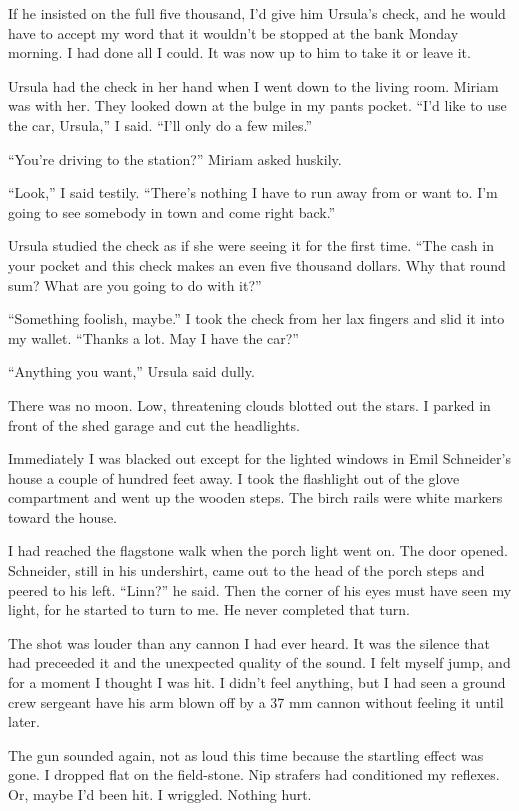 \documentclass{novel}
\begin{document}
If he insisted on the full five thousand, I’d give him Ursula’s check, and he would have to accept my word that it wouldn’t be stopped at the bank Monday morning. I had done all I could. It was now up to him to take it or leave it.

Ursula had the check in her hand when I went down to the living room. Miriam was with her. They looked down at the bulge in my pants pocket. “I’d like to use the car, Ursula,” I said. “I’ll only do a few miles.”

“You’re driving to the station?” Miriam asked huskily.

“Look,” I said testily. “There’s nothing I have to run away from or want to. I’m going to see somebody in town and come right back.”

Ursula studied the check as if she were seeing it for the first time. “The cash in your pocket and this check makes an even five thousand dollars. Why that round sum? What are you going to do with it?”

“Something foolish, maybe.” I took the check from her lax fingers and slid it into my wallet. “Thanks a lot. May I have the car?”

“Anything you want,” Ursula said dully.

\scenestars

There was no moon. Low, threatening clouds blotted out the stars. I parked in front of the shed garage and cut the headlights. 

Immediately I was blacked out except for the lighted windows in Emil Schneider’s house a couple of hundred feet away. I took the flashlight out of the glove compartment and went up the wooden steps. The birch rails were white markers toward the house.

I had reached the flagstone walk when the porch light went on. The door opened. Schneider, still in his undershirt, came out to the head of the porch steps and peered to his left. “Linn?” he said. Then the corner of his eyes must have seen my light, for he started to turn to me. He never completed that turn.

The shot was louder than any cannon I had ever heard. It was the silence that had preceeded it and the unexpected quality of the sound. I felt myself jump, and for a moment I thought I was hit. I didn’t feel anything, but I had seen a ground crew sergeant have his arm blown off by a 37 mm cannon without feeling it until later.

The gun sounded again, not as loud this time because the startling effect was gone. I dropped flat on the field-stone. Nip strafers had conditioned my reflexes. Or, maybe I’d been hit. I wriggled. Nothing hurt.
\end{document}
